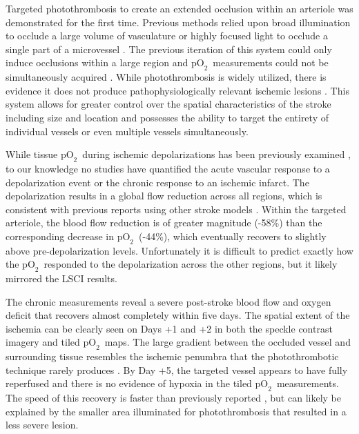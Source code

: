 \documentclass[12pt]{spieman}  %
\newcommand{\pO}{\ensuremath{\text{pO}_2}} 	            %
\begin{document}
\begin{spacing}{2}
Targeted photothrombosis to create an extended occlusion within an arteriole was demonstrated for the first time. Previous methods relied upon broad illumination to occlude a large volume of vasculature \cite{Watson:1985bp} or highly focused light to occlude a single part of a microvessel \cite{Schaffer:2006fb}. The previous iteration of this system could only induce occlusions within a large region and \pO\ measurements could not be simultaneously acquired \cite{Ponticorvo:2010uv}. While photothrombosis is widely utilized, there is evidence it does not produce pathophysiologically relevant ischemic lesions \cite{Carmichael:2005gk}. This system allows for greater control over the spatial characteristics of the stroke including size and location and possesses the ability to target the entirety of individual vessels or even multiple vessels simultaneously.

While tissue \pO\ during ischemic depolarizations has been previously examined \cite{vonBornstadt:2015dj}, to our knowledge no studies have quantified the acute vascular response to a depolarization event or the chronic response to an ischemic infarct. The depolarization results in a global flow reduction across all regions, which is consistent with previous reports using other stroke models \cite{Shin:2006dc,Nakamura:2010wp}. Within the targeted arteriole, the blood flow reduction is of greater magnitude (-58\%) than the corresponding decrease in \pO\ (-44\%), which eventually recovers to slightly above pre-depolarization levels. Unfortunately it is difficult to predict exactly how the \pO\ responded to the depolarization across the other regions, but it likely mirrored the LSCI results.

The chronic measurements reveal a severe post-stroke blood flow and oxygen deficit that recovers almost completely within five days. The spatial extent of the ischemia can be clearly seen on Days +1 and +2 in both the speckle contrast imagery and tiled \pO\ maps. The large gradient between the occluded vessel and surrounding tissue resembles the ischemic penumbra that the photothrombotic technique rarely produces \cite{Carmichael:2005gk}. By Day +5, the targeted vessel appears to have fully reperfused and there is no evidence of hypoxia in the tiled \pO\ measurements. The speed of this recovery is faster than previously reported \cite{Schrandt:2015gu}, but can likely be explained by the smaller area illuminated for photothrombosis that resulted in a less severe lesion.




\end{spacing}
\end{document}
